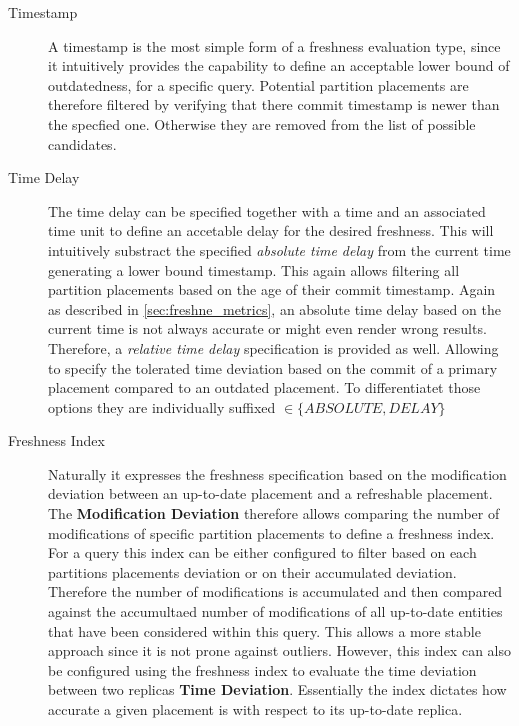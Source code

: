 \begin{description}
    \item[Timestamp] A timestamp is the most simple form of a freshness evaluation type, since it intuitively provides the capability to define 
    an acceptable lower bound of outdatedness, for a specific query. Potential partition placements are therefore filtered by verifying that there commit timestamp is newer
    than the specfied one. Otherwise they are removed from the list of possible candidates.
    
    \item[Time Delay]
    The time delay can be specified together with a time and an associated time unit to define an accetable delay for the desired freshness. 
    This will intuitively substract the specified \emph{absolute time delay} from the current time generating a lower bound timestamp. 
    This again allows filtering all partition placements based on the age of their commit timestamp.
    Again as described in \ref{sec:freshne_metrics}, an absolute time delay based on the current time is not always accurate or might even render wrong results.
    Therefore, a \emph{relative time delay} specification is provided as well. Allowing to specify the tolerated time deviation based on the commit of a primary placement 
    compared to an outdated placement. To differentiatet those options they are individually suffixed $\in \{ABSOLUTE, DELAY\}$

    \item[Freshness Index]
    Naturally it expresses the freshness specification based on the modification deviation between an up-to-date placement
    and a refreshable placement. The \textbf{Modification Deviation} therefore allows comparing the number of modifications of specific partition placements
    to define a freshness index. For a query this index can be either configured to filter based on each partitions placements deviation or on their accumulated deviation.
    Therefore the number of modifications is accumulated and then compared against the accumultaed number of modifications 
    of all up-to-date entities that have been considered within this query. This allows a more stable approach since it is not prone against outliers. 
    However, this index can also be configured using the freshness index to evaluate the time deviation between two replicas \textbf{Time Deviation}. 
    Essentially the index dictates how accurate a given placement is with respect to its up-to-date replica.
    
\end{description}


